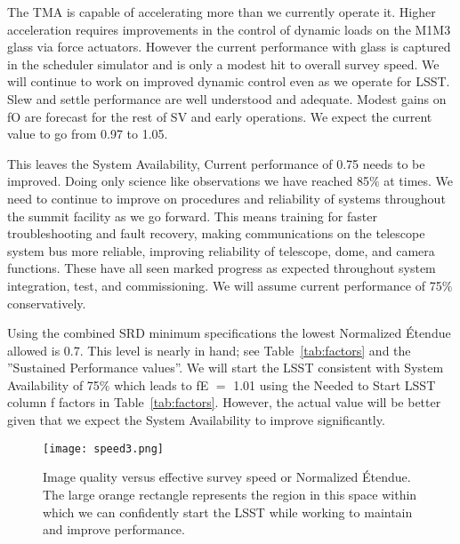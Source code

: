 The TMA is capable of accelerating more than we currently operate it. Higher acceleration requires improvements in the control of dynamic loads on the M1M3 glass via force actuators. However the current performance with glass is captured in the scheduler simulator and is only a modest hit to overall survey speed. We will continue to work on improved dynamic control even as we operate for LSST. Slew and settle performance are well understood and adequate. Modest gains on fO are forecast for the rest of SV and early operations. We expect the current value to go from 0.97 to 1.05. 

This leaves the System Availability, Current performance of 0.75 needs to be improved. Doing only science like observations we have reached 85$\%$ at times. We need to continue to improve on procedures and reliability of systems throughout the summit facility as we go forward. This means training for faster troubleshooting and fault recovery, making communications on the telescope system bus more reliable, improving reliability of telescope, dome, and camera functions. These have all seen marked progress as expected throughout system integration, test, and commissioning. We will assume current performance of 75$\%$ conservatively. 

Using the combined SRD minimum specifications the lowest Normalized \'{E}tendue allowed is 0.7. This level is nearly in hand; see Table~\ref{tab:factors} and the ''Sustained Performance values''. We will start the LSST consistent with System Availability of 75$\%$ which leads to fE $=$ 1.01 using the Needed to Start LSST column f factors in Table~\ref{tab:factors}. However, the actual value will be better given that we expect the System Availability to improve significantly. 

\begin{figure}[t]
\centering
\texttt{[image: speed3.png]}
\caption{Image quality versus effective survey speed or Normalized \'{E}tendue. The large orange rectangle represents the region in this space within which we can confidently start the LSST while working to maintain and improve performance.}
\label{speed3}
\end{figure}

\newpage
